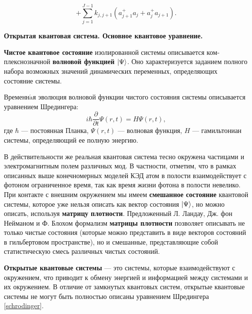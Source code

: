 \begin{equation}
	+\sum_{j=1}^{J-1}{k_{j,j+1}\left(a_{j+1}^+a_j+a_{j}^+a_{j+1}\right)}.
\end{equation}

\clearpage
\indent\textbf{Открытая квантовая система. Основное квантовое уравнение.}

\textbf{Чистое квантовое состояние} изолированной системы описывается ком­плекснозначной \textbf{волновой функцией} $|\Psi\rangle$. Оно характеризуется заданием полного набора возможных значений динамических переменных, определяющих состояние системы.

Временн$\acute{\text{a}}$я эволюция волновой функции чистого состояния системы описывается уравнением Шредингера:
\begin{equation}\label{schrodinger}
	i\hbar\frac{\partial}{\partial t}\Psi(r,t) = H\Psi(r,t),
\end{equation}
где $\hbar$ --- постоянная Планка, $\Psi(r,t)$ --- волновая функция, $H$ --- гамильтониан системы, определяющий ее полную энергию.

В действительности же реальная квантовая система тесно окружена частицами и электромагнитным полем различных мод. В частности, отметим, что в рамках описанных выше конечномерных моделей КЭД атом в полости взаимодействует с фотоном ограниченное время, так как время жизни фотона в полости невелико. При контакте с внешним окружением мы имеем \textbf{смешанное состояние} квантовой системы, которое уже нельзя описать как вектор состояния $ |\Psi\rangle$, но можно описать, используя \textbf{матрицу плотности}. Предложенный Л. Ландау, Дж. фон Нейманом и Ф. Блохом формализм \textbf{матрицы плотности} \cite{landau,belousov,messia} позволяет описывать не только чистые состояния (которые можно представить в виде векторов состояний в гильбертовом пространстве), но и смешанные, представляющие собой статистическую смесь различных чистых состояний.

\textbf{Открытые квантовые системы} \cite{breuer} --- это системы, ко­торые взаимодействуют с окружением, что приводит к обмену энергией и информацией между системами и их окружением. В отличие от замкнутых квантовых систем, открытые квантовые системы не могут быть полностью опи­саны уравнением Шредингера \eqref{schrodinger}.

